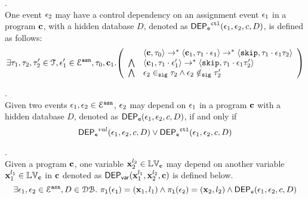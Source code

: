 %
\begin{defn}
\label{def:event_ctldep}.
\\
One event $\mathtt{\epsilon}_2$ may have a control dependency on an assignment event $\mathtt{\epsilon}_1$
in a program ${\boldsymbol{\mathbf{c}}}$, with a hidden database $D$, 
denoted as 
%
$\mathsf{DEP_{\mathtt{e}}}^{\mathtt{{ctl}}}(\mathtt{\epsilon}_1, \mathtt{\epsilon}_2, c, D)$, is defined as follows: 
%
\[
\exists \vtrace_1, \vtrace_2, \vtrace_2' \in \mathcal{T}, 
\event_1' \in \eventset^{\asn}, \vtrace_0, \ssa{c}_1.
\left(
\begin{array}{ll}   
  & \config{\ssa{c}, \vtrace_0} \rightarrow^{*} 
    \config{\ssa{c}_1, \vtrace_1 \cdot \event_1}  \rightarrow^{*} 
    \config{\eskip,  \vtrace_1 \cdot \event_1 \vtrace_2} 
  \\ 
  \bigwedge &
  \config{\ssa{c}_1, \vtrace_1 \cdot \event_1'}  \rightarrow^{*} 
  \config{\eskip,  \vtrace_1 \cdot \event_1 \vtrace_2' } 
  \\
  \bigwedge &
  \event_2 \sigin \vtrace_2 \land \event_2 \notsigin \vtrace_2'
\end{array}
\right)
 \]
%
\end{defn}
%
%
\begin{defn}.
\label{def:event_dep}
\\ 
Given two events $\mathtt{\epsilon}_1, \mathtt{\epsilon}_2 \in \mathcal{E}^{\mathtt{{asn}}}$,
$\mathtt{\epsilon}_2$ may depend on $\mathtt{\epsilon}_1$ in a program ${\boldsymbol{\mathbf{c}}}$ with a hidden database $D$, denoted as $\mathsf{DEP_{\mathtt{e}}}(\mathtt{\epsilon}_1, \mathtt{\epsilon}_2, c, D)$,
if and only if
%
\[
\mathsf{DEP_{\mathtt{e}}}^{val}(\mathtt{\epsilon}_1, \mathtt{\epsilon}_2, c, D) 
\lor
\mathsf{DEP_{\mathtt{e}}}^{\mathtt{{ctl}}}(\mathtt{\epsilon}_1, \mathtt{\epsilon}_2, c, D) 
\] %
%
\end{defn}
%
\begin{defn}.
\label{def:var_dep}
\\
Given a program ${\boldsymbol{\mathbf{c}}}$, 
one variable ${\boldsymbol{\mathbf{x}}}_2^{l_2} \in \mathbb{LV}_{{\boldsymbol{\mathbf{c}}}}$ may depend on another variable 
${\boldsymbol{\mathbf{x}}}_1^{l_1} \in \mathbb{LV}_{{\boldsymbol{\mathbf{c}}}}$ in ${\boldsymbol{\mathbf{c}}}$ denoted as 
%
$\mathsf{DEP_{var}}({\boldsymbol{\mathbf{x}}}_1^{l_1}, {\boldsymbol{\mathbf{x}}}_2^{l_2}, {\boldsymbol{\mathbf{c}}})$ is defined below.
%
\[
\exists \mathtt{\epsilon}_1, \mathtt{\epsilon}_2 \in \mathcal{E}^{\mathtt{{asn}}}, D \in \mathcal{DB}. ~
\mathtt{\pi_{l}(\mathtt{\epsilon}_1)} = ({\boldsymbol{\mathbf{x}}}_1, l_1)
\land
\mathtt{\pi_{l}(\mathtt{\epsilon}_2)} = ({\boldsymbol{\mathbf{x}}}_2, l_2)
\land 
\mathsf{DEP_{\mathtt{e}}}(\mathtt{\epsilon}_1, \mathtt{\epsilon}_2, c, D)
\] 
%
%
\end{defn}
